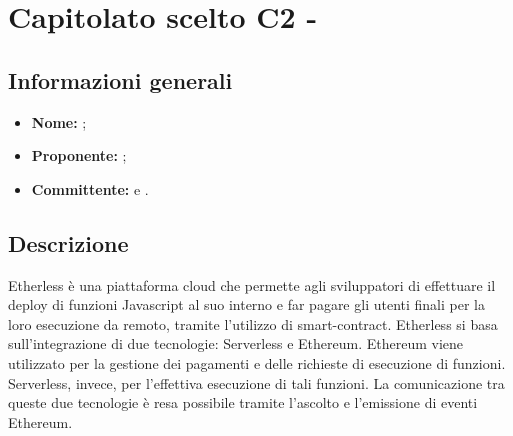 \section{Capitolato scelto C2 - \NomeProgetto}

\subsection{Informazioni generali}
	\begin{itemize}
		\item \textbf{Nome:} \NomeProgetto{}; 
		\item \textbf{Proponente}\textbf{:} \Proponente{};
		\item \textbf{Committente}\textbf{:} \TV{} e \RC{}. 
	\end{itemize}

\subsection{Descrizione}
Etherless è una piattaforma cloud che permette agli sviluppatori di effettuare il deploy di funzioni Javascript al suo interno e far pagare gli utenti finali per la loro esecuzione da remoto, tramite l'utilizzo di smart-contract. Etherless si basa sull'integrazione di due tecnologie: Serverless e Ethereum. Ethereum viene utilizzato per la gestione dei pagamenti e delle richieste di esecuzione di funzioni. Serverless, invece, per l'effettiva esecuzione di tali funzioni. La comunicazione tra queste due tecnologie è resa possibile tramite l'ascolto e l'emissione di eventi Ethereum.


